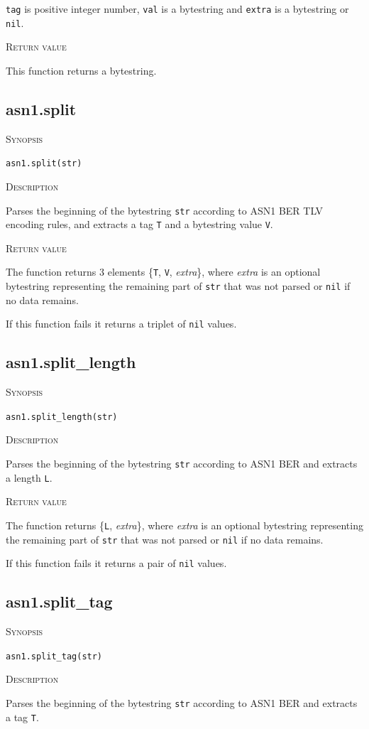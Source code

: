 \documentclass[11pt]{report}
\newcommand{\mansection}[1]{\vspace{0.5em}\par\noindent\textsc{#1}\vspace{0.5em}\par}
\newcommand{\syn}[1]{\texttt{#1}}
\begin{document}
  \syn{tag} is positive integer number, \syn{val} is a bytestring and 
  \syn{extra} is a bytestring or \syn{nil}.

\mansection{Return value}
  This function returns a bytestring.

\subsection{asn1.split}

\mansection{Synopsis}
\syn{asn1.split(str)}

\mansection{Description}
  Parses the beginning of the bytestring \syn{str} according to ASN1 BER 
  TLV encoding rules, and extracts a tag \syn{T} and a bytestring value \syn{V}.

\mansection{Return value}
  The function returns 3 elements \{\syn{T}, \syn{V}, \textit{extra}\}, 
  where \textit{extra} is an optional bytestring representing the remaining part of 
  \syn{str} that was not parsed or \syn{nil} if no data remains.

  If this function fails it returns a triplet of \syn{nil} values.


\subsection{asn1.split\_length}

\mansection{Synopsis}
\syn{asn1.split\_length(str)}

\mansection{Description}
  Parses the beginning of the bytestring \syn{str} according to ASN1 BER 
  and extracts a length \syn{L}. 

\mansection{Return value}
  The function returns \{\syn{L}, \textit{extra}\}, where \textit{extra} is an optional bytestring 
  representing the remaining part of \syn{str} that was not parsed or \syn{nil} 
  if no data remains.

  If this function fails it returns a pair of \syn{nil} values.


\subsection{asn1.split\_tag}

\mansection{Synopsis}
\syn{asn1.split\_tag(str)}

\mansection{Description}
  Parses the beginning of the bytestring \syn{str} according to ASN1 BER 
  and extracts a tag \syn{T}. 
\end{document}

